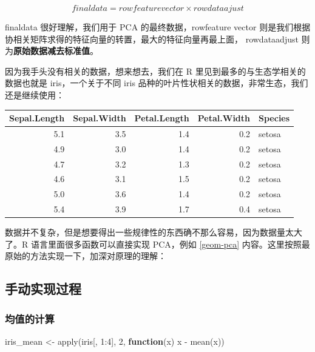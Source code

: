 \documentclass[
]{krantz}
\makeatletter
\newenvironment{Shaded}{\begin{snugshade}}{\end{snugshade}}
\newcommand{\ControlFlowTok}[1]{\textcolor[rgb]{0.13,0.29,0.53}{\textbf{#1}}}
\newcommand{\DecValTok}[1]{\textcolor[rgb]{0.00,0.00,0.81}{#1}}
\newcommand{\FunctionTok}[1]{\textcolor[rgb]{0.00,0.00,0.00}{#1}}
\newcommand{\NormalTok}[1]{#1}
\newcommand{\OtherTok}[1]{\textcolor[rgb]{0.56,0.35,0.01}{#1}}
\newcommand{\SpecialCharTok}[1]{\textcolor[rgb]{0.00,0.00,0.00}{#1}}
\newenvironment{kframe}{%
\medskip{}
\setlength{\fboxsep}{.8em}
 \def\at@end@of@kframe{}%
 \ifinner\ifhmode%
  \def\at@end@of@kframe{\end{minipage}}%
  \begin{minipage}{\columnwidth}%
 \fi\fi%
 \def\FrameCommand##1{\hskip\@totalleftmargin \hskip-\fboxsep
 \colorbox{shadecolor}{##1}\hskip-\fboxsep
     \hskip-\linewidth \hskip-\@totalleftmargin \hskip\columnwidth}%
 \MakeFramed {\advance\hsize-\width
   \@totalleftmargin\z@ \linewidth\hsize
   \@setminipage}}%
 {\par\unskip\endMakeFramed%
 \at@end@of@kframe}
\renewenvironment{Shaded}{\begin{kframe}}{\end{kframe}}
\makeatother
\begin{document}
\begin{equation}
finaldata = rowfeaturevector \times rowdataajust
\label{eq:despca}
\end{equation}

finaldata 很好理解，我们用于 PCA 的最终数据，rowfeature vector 则是我们根据协相关矩阵求得的特征向量的转置，最大的特征向量再最上面， rowdataadjust 则为\textbf{原始数据减去标准值}。

因为我手头没有相关的数据，想来想去，我们在 R 里见到最多的与生态学相关的数据也就是 iris，一个关于不同 iris 品种的叶片性状相关的数据，非常生态，我们还是继续使用：

\begin{tabular}{r|r|r|r|l}
\hline
Sepal.Length & Sepal.Width & Petal.Length & Petal.Width & Species\\
\hline
5.1 & 3.5 & 1.4 & 0.2 & setosa\\
\hline
4.9 & 3.0 & 1.4 & 0.2 & setosa\\
\hline
4.7 & 3.2 & 1.3 & 0.2 & setosa\\
\hline
4.6 & 3.1 & 1.5 & 0.2 & setosa\\
\hline
5.0 & 3.6 & 1.4 & 0.2 & setosa\\
\hline
5.4 & 3.9 & 1.7 & 0.4 & setosa\\
\hline
\end{tabular}

数据并不复杂，但是想要得出一些规律性的东西确不那么容易，因为数据量太大了。R 语言里面很多函数可以直接实现 PCA，例如 \ref{geom-pca} 内容。这里按照最原始的方法实现一下，加深对原理的理解：

\hypertarget{man_pca}{%
\subsection{手动实现过程}\label{man_pca}}

\hypertarget{av_val}{%
\subsubsection{均值的计算}\label{av_val}}

\begin{Shaded}
\begin{Highlighting}[]
\NormalTok{iris\_mean }\OtherTok{\textless{}{-}} \FunctionTok{apply}\NormalTok{(iris[, }\DecValTok{1}\SpecialCharTok{:}\DecValTok{4}\NormalTok{], }\DecValTok{2}\NormalTok{, }\ControlFlowTok{function}\NormalTok{(x) x }\SpecialCharTok{{-}} \FunctionTok{mean}\NormalTok{(x))}
\end{Highlighting}
\end{Shaded}
\end{document}
